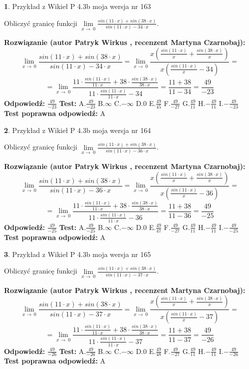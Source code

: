 \documentclass[12pt, a4paper]{article}
\theoremstyle{definition} %
\newtheorem{zad}{}
\newcommand{\zadStart}[1]{\begin{zad}#1\newline}
\newcommand{\zadStop}{\end{zad}}
\newcommand{\rozwStart}[2]{\noindent \textbf{Rozwiązanie (autor #1 , recenzent #2): }\newline}
\newcommand{\rozwStop}{\newline}
\newcommand{\odpStart}{\noindent \textbf{Odpowiedź:}\newline}
\newcommand{\odpStop}{\newline}
\newcommand{\testStart}{\noindent \textbf{Test:}\newline}
\newcommand{\testStop}{\newline}
\newcommand{\kluczStart}{\noindent \textbf{Test poprawna odpowiedź:}\newline}
\newcommand{\kluczStop}{\newline}
\begin{document}
\zadStart{Przykład z Wikieł P 4.3b moja wersja nr 163}


Obliczyć granicę funkcji $\lim\limits_{x\to\ 0}\frac{sin(11 \cdot x)+sin(38 \cdot x)}{sin(11 \cdot x)-34 \cdot x}$.
\zadStop
\rozwStart{Patryk Wirkus}{Martyna Czarnobaj}
$$\lim\limits_{x\to\ 0}\frac{sin(11 \cdot x)+sin(38 \cdot x)}{sin(11 \cdot x)-34 \cdot x}=\lim\limits_{x\to\ 0}\frac{x(\frac{sin(11 \cdot x)}{x}+\frac{sin(38 \cdot x)}{x})}{x(\frac{sin(11 \cdot x)}{x}-34)}=$$
$$=\lim\limits_{x\to\ 0}\frac{11 \cdot \frac{sin(11 \cdot x)}{11 \cdot x}+38 \cdot \frac{sin(38 \cdot x)}{38 \cdot x}}{11 \cdot \frac{sin(11 \cdot x)}{11 \cdot x}-34}=\frac{11+38}{11-34} = \frac{49}{-23}$$
\rozwStop
\odpStart
$\frac{49}{-23}$
\odpStop
\testStart
A.$\frac{49}{-23}$
B.$\infty$
C.$-\infty$
D.$0$
E.$\frac{49}{45}$
F.$\frac{49}{-27}$
G.$\frac{49}{11}$
H.$-\frac{49}{11}$
I.$-\frac{49}{-23}$
\testStop
\kluczStart
A
\kluczStop



\zadStart{Przykład z Wikieł P 4.3b moja wersja nr 164}


Obliczyć granicę funkcji $\lim\limits_{x\to\ 0}\frac{sin(11 \cdot x)+sin(38 \cdot x)}{sin(11 \cdot x)-36 \cdot x}$.
\zadStop
\rozwStart{Patryk Wirkus}{Martyna Czarnobaj}
$$\lim\limits_{x\to\ 0}\frac{sin(11 \cdot x)+sin(38 \cdot x)}{sin(11 \cdot x)-36 \cdot x}=\lim\limits_{x\to\ 0}\frac{x(\frac{sin(11 \cdot x)}{x}+\frac{sin(38 \cdot x)}{x})}{x(\frac{sin(11 \cdot x)}{x}-36)}=$$
$$=\lim\limits_{x\to\ 0}\frac{11 \cdot \frac{sin(11 \cdot x)}{11 \cdot x}+38 \cdot \frac{sin(38 \cdot x)}{38 \cdot x}}{11 \cdot \frac{sin(11 \cdot x)}{11 \cdot x}-36}=\frac{11+38}{11-36} = \frac{49}{-25}$$
\rozwStop
\odpStart
$\frac{49}{-25}$
\odpStop
\testStart
A.$\frac{49}{-25}$
B.$\infty$
C.$-\infty$
D.$0$
E.$\frac{49}{47}$
F.$\frac{49}{-27}$
G.$\frac{49}{11}$
H.$-\frac{49}{11}$
I.$-\frac{49}{-25}$
\testStop
\kluczStart
A
\kluczStop



\zadStart{Przykład z Wikieł P 4.3b moja wersja nr 165}


Obliczyć granicę funkcji $\lim\limits_{x\to\ 0}\frac{sin(11 \cdot x)+sin(38 \cdot x)}{sin(11 \cdot x)-37 \cdot x}$.
\zadStop
\rozwStart{Patryk Wirkus}{Martyna Czarnobaj}
$$\lim\limits_{x\to\ 0}\frac{sin(11 \cdot x)+sin(38 \cdot x)}{sin(11 \cdot x)-37 \cdot x}=\lim\limits_{x\to\ 0}\frac{x(\frac{sin(11 \cdot x)}{x}+\frac{sin(38 \cdot x)}{x})}{x(\frac{sin(11 \cdot x)}{x}-37)}=$$
$$=\lim\limits_{x\to\ 0}\frac{11 \cdot \frac{sin(11 \cdot x)}{11 \cdot x}+38 \cdot \frac{sin(38 \cdot x)}{38 \cdot x}}{11 \cdot \frac{sin(11 \cdot x)}{11 \cdot x}-37}=\frac{11+38}{11-37} = \frac{49}{-26}$$
\rozwStop
\odpStart
$\frac{49}{-26}$
\odpStop
\testStart
A.$\frac{49}{-26}$
B.$\infty$
C.$-\infty$
D.$0$
E.$\frac{49}{48}$
F.$\frac{49}{-27}$
G.$\frac{49}{11}$
H.$-\frac{49}{11}$
I.$-\frac{49}{-26}$
\testStop
\kluczStart
A
\kluczStop
\end{document}
